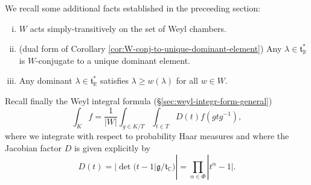 \documentclass[reqno]{amsart} 
\begin{document}
We recall some additional facts established in the preceeding section:
\begin{enumerate}
[(i)]
\item $W$ acts simply-transitively on the set of Weyl chambers.
\item (dual form of Corollary \ref{cor:W-conj-to-unique-dominant-element}) Any $\lambda \in \mathfrak{t}_{\mathbb{R}}^*$ is $W$-conjugate to a unique dominant element.
\item Any dominant $\lambda \in \mathfrak{t}_{\mathbb{R}}^*$ satisfies $\lambda \geq w(\lambda)$ for all $w \in W$.
\end{enumerate}

Recall finally the Weyl integral formula (\S\ref{sec:weyl-integr-form-general})
\begin{equation}\label{eqn:WIF-recall-for-reps}
  \int_K f
  = \frac{1}{|W|}
  \int_{g \in K/T}
  \int_{t \in T}
  D(t) f (g t g^{-1}),
\end{equation}
where we integrate with respect to probability Haar measures and where the Jacobian factor $D$ is given explicitly by
\begin{equation*}
  D(t) = |\det( t - 1  |
  \mathfrak{g}/\mathfrak{t}_{\mathbb{C}})|
  =
  \prod_{\alpha \in   \Phi}
  |t^{\alpha}-1|.
\end{equation*}
\end{document}
